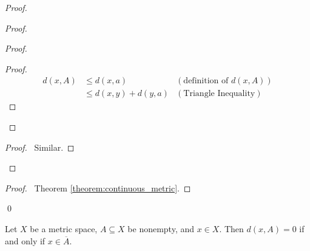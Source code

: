 \begin{proof}
    \pf
    \begin{proof}
        \begin{proof}
            \pf
            \begin{proof}
                \pf
                \begin{align*}
                    d(x,A) & \leq d(x,a) & (\text{definition of $d(x,A)$})\\
                    & \leq d(x,y) + d(y,a) & (\text{Triangle Inequality})
                \end{align*}
            \end{proof}
        \end{proof}
        \begin{proof}
            \pf\ Similar.
        \end{proof}
    \end{proof}
    \qedstep
    \begin{proof}
        \pf\ Theorem \ref{theorem:continuous_metric}.
    \end{proof}
    \qed
\end{proof}

\begin{theorem}
    Let $X$ be a metric space, $A \subseteq X$ be nonempty, and $x \in X$.
    Then $d(x, A) = 0$ if and only if $x \in \overline{A}$.
\end{theorem}


